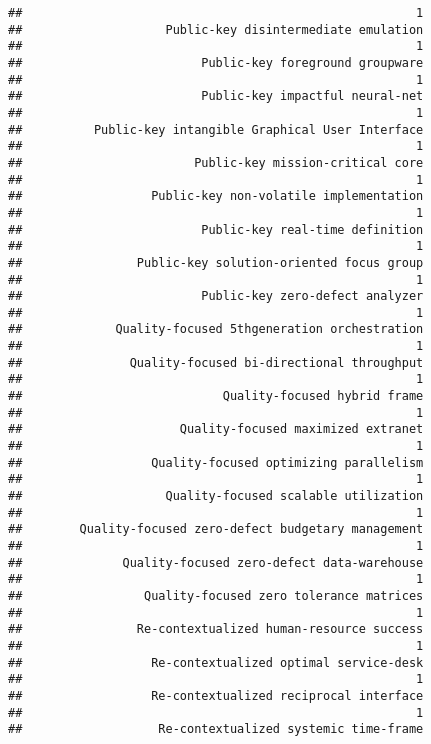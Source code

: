 \documentclass[
]{article}
\begin{document}
\begin{verbatim}
##                                                       1 
##                    Public-key disintermediate emulation 
##                                                       1 
##                         Public-key foreground groupware 
##                                                       1 
##                         Public-key impactful neural-net 
##                                                       1 
##          Public-key intangible Graphical User Interface 
##                                                       1 
##                        Public-key mission-critical core 
##                                                       1 
##                  Public-key non-volatile implementation 
##                                                       1 
##                         Public-key real-time definition 
##                                                       1 
##                Public-key solution-oriented focus group 
##                                                       1 
##                         Public-key zero-defect analyzer 
##                                                       1 
##             Quality-focused 5thgeneration orchestration 
##                                                       1 
##               Quality-focused bi-directional throughput 
##                                                       1 
##                            Quality-focused hybrid frame 
##                                                       1 
##                      Quality-focused maximized extranet 
##                                                       1 
##                  Quality-focused optimizing parallelism 
##                                                       1 
##                    Quality-focused scalable utilization 
##                                                       1 
##        Quality-focused zero-defect budgetary management 
##                                                       1 
##              Quality-focused zero-defect data-warehouse 
##                                                       1 
##                 Quality-focused zero tolerance matrices 
##                                                       1 
##                Re-contextualized human-resource success 
##                                                       1 
##                  Re-contextualized optimal service-desk 
##                                                       1 
##                  Re-contextualized reciprocal interface 
##                                                       1 
##                   Re-contextualized systemic time-frame 

\end{verbatim}
\end{document}
